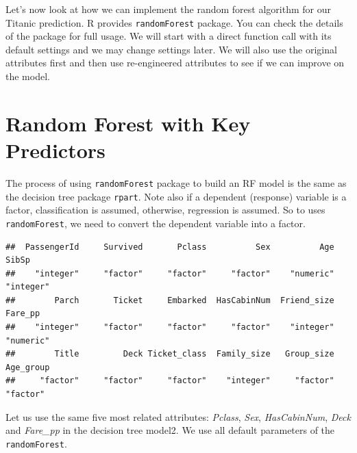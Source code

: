 \documentclass[
]{book}
\newenvironment{Shaded}{\begin{snugshade}}{\end{snugshade}}
\newcommand{\CommentTok}[1]{\textcolor[rgb]{0.56,0.35,0.01}{\textit{#1}}}
\newcommand{\KeywordTok}[1]{\textcolor[rgb]{0.13,0.29,0.53}{\textbf{#1}}}
\newcommand{\NormalTok}[1]{#1}
\newcommand{\OperatorTok}[1]{\textcolor[rgb]{0.81,0.36,0.00}{\textbf{#1}}}
\newcommand{\StringTok}[1]{\textcolor[rgb]{0.31,0.60,0.02}{#1}}
\begin{document}
Let's now look at how we can implement the random forest algorithm for our Titanic prediction.
R provides \texttt{\textquotesingle{}randomForest\textquotesingle{}} package. You can check the details of the package for full usage. We will start with a direct function call with its default settings and we may change settings later. We will also use the original attributes first and then use re-engineered attributes to see if we can improve on the model.

\hypertarget{random-forest-with-key-predictors}{%
\section{Random Forest with Key Predictors}\label{random-forest-with-key-predictors}}

The process of using \texttt{randomForest} package to build an RF model is the same as the decision tree package \texttt{rpart}. Note also if a dependent (response) variable is a factor, classification is assumed, otherwise, regression is assumed. So to uses \texttt{randomForest}, we need to convert the dependent variable into a factor.

\begin{Shaded}
\end{Shaded}

\begin{verbatim}
##  PassengerId     Survived       Pclass          Sex          Age        SibSp 
##    "integer"     "factor"     "factor"     "factor"    "numeric"    "integer" 
##        Parch       Ticket     Embarked  HasCabinNum  Friend_size      Fare_pp 
##    "integer"     "factor"     "factor"     "factor"    "integer"    "numeric" 
##        Title         Deck Ticket_class  Family_size   Group_size    Age_group 
##     "factor"     "factor"     "factor"    "integer"     "factor"     "factor"
\end{verbatim}

Let us use the same five most related attributes: \emph{Pclass}, \emph{Sex}, \emph{HasCabinNum}, \emph{Deck} and \emph{Fare\_pp} in the decision tree model2. We use all default parameters of the \texttt{randomForest}.
\end{document}
